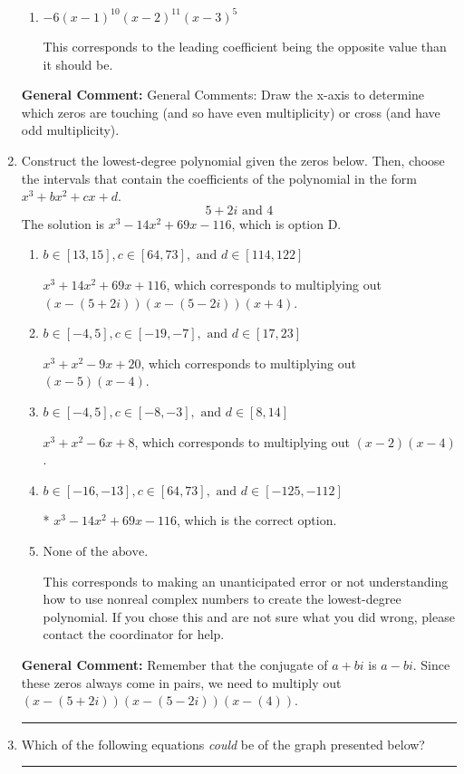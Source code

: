 \documentclass{extbook}[14pt]
\newcommand{\litem}[1]{\item #1

\rule{\textwidth}{0.4pt}}
\begin{document}
\begin{enumerate}
{\begin{enumerate}[label=\Alph*.]
* This is the correct option.
\item \( -6(x - 1)^{10} (x - 2)^{11} (x - 3)^{5} \)

This corresponds to the leading coefficient being the opposite value than it should be.
\end{enumerate}

\textbf{General Comment:} General Comments: Draw the x-axis to determine which zeros are touching (and so have even multiplicity) or cross (and have odd multiplicity).
}
\litem{
Construct the lowest-degree polynomial given the zeros below. Then, choose the intervals that contain the coefficients of the polynomial in the form $x^3+bx^2+cx+d$.
\[ 5 + 2 i \text{ and } 4 \]The solution is \( x^{3} -14 x^{2} +69 x -116 \), which is option D.\begin{enumerate}[label=\Alph*.]
\item \( b \in [13, 15], c \in [64, 73], \text{ and } d \in [114, 122] \)

$x^{3} +14 x^{2} +69 x + 116$, which corresponds to multiplying out $(x-(5 + 2 i))(x-(5 - 2 i))(x + 4)$.
\item \( b \in [-4, 5], c \in [-19, -7], \text{ and } d \in [17, 23] \)

$x^{3} + x^{2} -9 x + 20$, which corresponds to multiplying out $(x -5)(x -4)$.
\item \( b \in [-4, 5], c \in [-8, -3], \text{ and } d \in [8, 14] \)

$x^{3} + x^{2} -6 x + 8$, which corresponds to multiplying out $(x -2)(x -4)$.
\item \( b \in [-16, -13], c \in [64, 73], \text{ and } d \in [-125, -112] \)

* $x^{3} -14 x^{2} +69 x -116$, which is the correct option.
\item \( \text{None of the above.} \)

This corresponds to making an unanticipated error or not understanding how to use nonreal complex numbers to create the lowest-degree polynomial. If you chose this and are not sure what you did wrong, please contact the coordinator for help.
\end{enumerate}

\textbf{General Comment:} Remember that the conjugate of $a+bi$ is $a-bi$. Since these zeros always come in pairs, we need to multiply out $(x-(5 + 2 i))(x-(5 - 2 i))(x-(4))$.
}
\litem{
Which of the following equations \textit{could} be of the graph presented below?

}
\end{enumerate}
\end{document}
